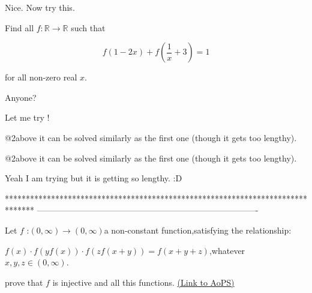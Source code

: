 \begin{solution}
	\begin{tcolorbox}Nice. Now try this.

Find all $f: \mathbb{R}\to\mathbb{R}$ such that

$$f \left( 1-2x \right) + f \left( \frac{1}{x} + 3 \right) = 1$$

for all non-zero real $x$.\end{tcolorbox}

Anyone?
\end{solution}



\begin{solution}
	Let me try !
\end{solution}



\begin{solution}
	@2above it can be solved similarly as the first one (though it gets too lengthy).
\end{solution}



\begin{solution}
	\begin{tcolorbox}@2above it can be solved similarly as the first one (though it gets too lengthy).\end{tcolorbox}

Yeah I am trying but it is getting so lengthy. :D
\end{solution}
*******************************************************************************
-------------------------------------------------------------------------------

\begin{problem}
	Let $f$ :$\left(0,\infty\right)\rightarrow\left(0,\infty\right)$a
non-constant function,satisfying the relationship:

$f\left(x\right)\cdotp f\left(yf\left(x\right)\right)\cdotp f\left(zf\left(x+y\right)\right)=f\left(x+y+z\right)$,whatever
$x,y,z\in\left(0,\infty\right)$.

prove that $f$ is injective and all this functions.
	\flushright \href{https://artofproblemsolving.com/community/c6h1600592}{(Link to AoPS)}
\end{problem}



